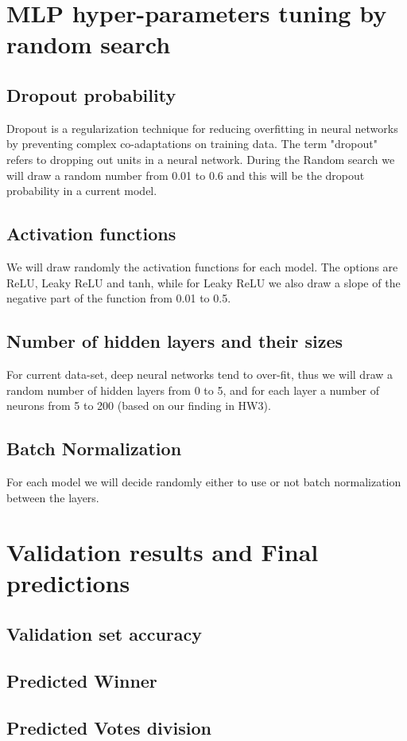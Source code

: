 \documentclass[12pt]{article}
\begin{document}
\section{MLP hyper-parameters tuning by random search}
\subsection{Dropout probability}
Dropout is a regularization technique for reducing overfitting in neural networks by preventing complex co-adaptations on training data. The term "dropout" refers to dropping out units in a neural network. During the Random search we will draw a random number from 0.01 to 0.6 and this will be the dropout probability in a current model. 
\subsection{Activation functions}
We will draw randomly the activation functions for each model. The options are ReLU, Leaky ReLU and tanh, while for Leaky ReLU we also draw a slope of the negative part of the function from 0.01 to 0.5.
\subsection{Number of hidden layers and their sizes}
For current data-set, deep neural networks tend to over-fit, thus we will draw a random number of hidden layers from 0 to 5, and for each layer a number of neurons from 5 to 200 (based on our finding in HW3).
\subsection{Batch Normalization}
For each model we will decide randomly either to use or not batch normalization between the layers. 

\section{Validation results and Final predictions}
\subsection{Validation set accuracy}
\subsection{Predicted Winner}
\subsection{Predicted Votes division}
\end{document}
